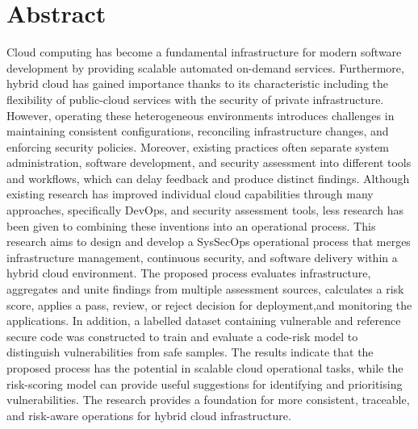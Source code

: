 \chapter*{Abstract}
\label{abstract}

Cloud computing has become a fundamental infrastructure for modern software development by providing scalable automated on-demand services. Furthermore, hybrid cloud has gained importance thanks to its characteristic including the flexibility of public-cloud services with the security of private infrastructure. However, operating these heterogeneous environments introduces challenges in maintaining consistent configurations, reconciling infrastructure changes, and enforcing security policies. Moreover, existing practices often separate system administration, software development, and security assessment into different tools and workflows, which can delay feedback and produce distinct findings. Although existing research has improved individual cloud capabilities through many approaches, specifically DevOps, and security assessment tools, less research has been given to combining these inventions into an operational process. This research aims to design and develop a SysSecOps operational process that merges infrastructure management, continuous security, and software delivery within a hybrid cloud environment. The proposed process evaluates infrastructure, aggregates and unite findings from multiple assessment sources, calculates a risk score, applies a pass, review, or reject decision for deployment,and monitoring the applications. In addition, a labelled dataset containing vulnerable and reference secure code was constructed to train and evaluate a code-risk model to distinguish vulnerabilities from safe samples. The results indicate that the proposed process has the potential in scalable cloud operational tasks, while the risk-scoring model can provide useful suggestions for identifying and prioritising vulnerabilities. The research provides a foundation for more consistent, traceable, and risk-aware operations for hybrid cloud infrastructure.


